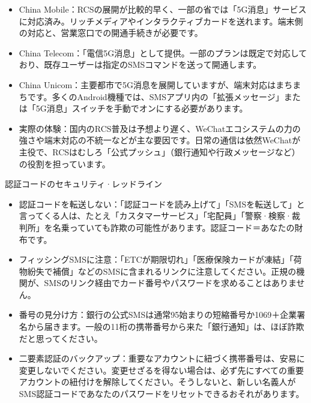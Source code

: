 
\begin{itemize}
  \item China Mobile：RCSの展開が比較的早く、一部の省では「5G消息」サービスに対応済み。リッチメディアやインタラクティブカードを送れます。端末側の対応と、営業窓口での開通手続きが必要です。
  \item China Telecom：「電信5G消息」として提供。一部のプランは既定で対応しており、既存ユーザーは指定のSMSコマンドを送って開通します。
  \item China Unicom：主要都市で5G消息を展開していますが、端末対応はまちまちです。多くのAndroid機種では、SMSアプリ内の「拡張メッセージ」または「5G消息」スイッチを手動でオンにする必要があります。
  \item 実際の体験：国内のRCS普及は予想より遅く、WeChatエコシステムの力の強さや端末対応の不統一などが主な要因です。日常の通信は依然WeChatが主役で、RCSはむしろ「公式プッシュ」（銀行通知や行政メッセージなど）の役割を担っています。
\end{itemize}

\begin{tcbwarn}{認証コードのセキュリティ·レッドライン}
\begin{itemize}
  \item 認証コードを転送しない：「認証コードを読み上げて」「SMSを転送して」と言ってくる人は、たとえ「カスタマーサービス」「宅配員」「警察·検察·裁判所」を名乗っていても詐欺の可能性があります。認証コード＝あなたの財布です。
  \item フィッシングSMSに注意：「ETCが期限切れ」「医療保険カードが凍結」「荷物紛失で補償」などのSMSに含まれるリンクに注意してください。正規の機関が、SMSのリンク経由でカード番号やパスワードを求めることはありません。
  \item 番号の見分け方：銀行の公式SMSは通常95始まりの短縮番号か1069＋企業署名から届きます。一般の11桁の携帯番号から来た「銀行通知」は、ほぼ詐欺だと思ってください。
  \item 二要素認証のバックアップ：重要なアカウントに紐づく携帯番号は、安易に変更しないでください。変更せざるを得ない場合は、必ず先にすべての重要アカウントの紐付けを解除してください。そうしないと、新しい名義人がSMS認証コードであなたのパスワードをリセットできるおそれがあります。
\end{itemize}

\end{tcbwarn}


